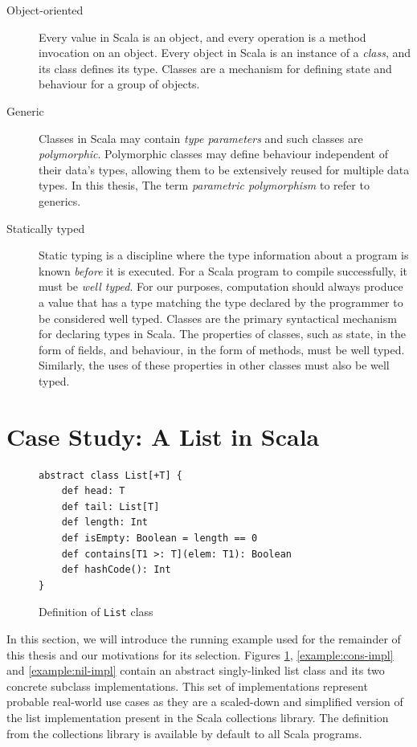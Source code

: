 \begin{description}
	\item[Object-oriented] 
	Every value in Scala is an object, and every operation is a method invocation on an object. 
	Every object in Scala is an instance of a \textit{class}, and its class defines its type.
	Classes\cite{simula:classes} are a mechanism for defining state and behaviour for a group of objects.	
	
	\item[Generic] 
	Classes in Scala may contain \textit{type parameters} and such classes are \textit{polymorphic}\cite{strachey:fundamental-concepts}.
	Polymorphic classes may define behaviour independent of their data's types, allowing them to be extensively reused for multiple data types.
	In this thesis, The term \textit{parametric polymorphism} to refer to generics.
	
	\item[Statically typed] 
	Static typing is a discipline where the type information about a program is known \textit{before} it is executed.
	For a Scala program to compile successfully, it must be \textit{well typed}.
	For our purposes, computation should always produce a value that has a type matching the type declared by the programmer to be considered well typed.
	Classes are the primary syntactical mechanism for declaring types in Scala. 
	The properties of classes, such as state, in the form of fields, and behaviour, in the form of methods, must be well typed.
	Similarly, the uses of these properties in other classes must also be well typed. 
\end{description}

\section{Case Study: A List in Scala}

\begin{figure}[!htb]
\begin{verbatim}
abstract class List[+T] {
	def head: T
	def tail: List[T]
	def length: Int
	def isEmpty: Boolean = length == 0
	def contains[T1 >: T](elem: T1): Boolean
    def hashCode(): Int 
}
\end{verbatim}
\caption{Definition of \texttt{List} class}
\label{example:list-def}
\end{figure}

In this section, we will introduce the running example used for the remainder of this thesis and our motivations for its selection.
Figures \ref{example:list-def}, \ref{example:cons-impl} and \ref{example:nil-impl} contain an abstract singly-linked list class and its two concrete subclass implementations. 
This set of  implementations represent probable real-world use cases as they are a scaled-down and simplified version of the list implementation present in the Scala collections library.
The  definition from the collections library is available by default to all Scala programs.

